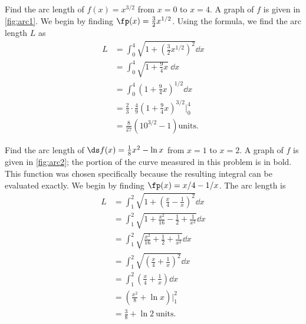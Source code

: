 \begin{example}\label{ex_arc1}
Find the arc length of $f(x) = x^{3/2}$ from $x=0$ to $x=4$.
\solution
A graph of $f$ is given in \autoref{fig:arc1}.
We begin by finding $\fp(x)= \frac32x^{1/2}$. Using the formula, we find the arc length $L$ as
\begin{align*}
	L
	&=	\int_0^4 \sqrt{1+\left(\frac32x^{1/2}\right)^2}\dd x \\
	&=	\int_0^4 \sqrt{1+\frac94x}\ \dd x \\
	&= 	\int_0^4 \left(1+\frac94x\right)^{1/2}\dd x \\
	&=  \frac23\cdot\frac49\left(1+\frac94x\right)^{3/2}\Big|_0^4 \\
	&=	\frac{8}{27}\left(10^{3/2}-1\right)\text{units}. %
\end{align*}
\end{example}

\begin{example}\label{ex_arc2}
Find the arc length of $\ds f(x) =\frac18x^2-\ln x$ from $x=1$ to $x=2$.
\solution
A graph of $f$ is given in \autoref{fig:arc2}; the portion of the curve measured in this problem is in bold.
This function was chosen specifically because the resulting integral can be evaluated exactly. We begin by finding $\fp(x) = x/4-1/x$. The arc length is 
\begin{align*}
	L
	&=  \int_1^2 \sqrt{1+ \left(\frac x4-\frac1x\right)^2}\dd x \\
	&= 	\int_1^2 \sqrt{ 1 + \frac{x^2}{16} -\frac12 + \frac1{x^2} } \dd x \\
	&=	\int_1^2 \sqrt{ \frac{x^2}{16} +\frac12 + \frac1{x^2} } \dd x \\
	&=	\int_1^2	\sqrt{ \left(\frac x4 + \frac1x\right)^2 }\dd x \\
	&= \int_1^2 \left(\frac x4 + \frac1x\right) \dd x \\
	&=  \left(\frac{x^2}8 + \ln x\right)\Bigg|_1^2\\
	&=	\frac38+\ln 2\ \text{units}. %
\end{align*}
\end{example}

